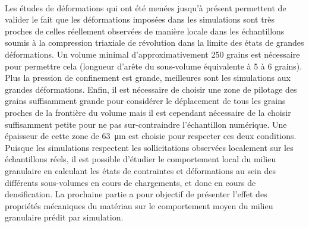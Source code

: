 	\paragraph{}
	Les études de déformations qui ont été menées jusqu'à présent permettent de valider le fait que les déformations imposées dans les simulations sont très proches de celles réellement observées de manière locale dans les échantillons soumis à la compression triaxiale de révolution dans la limite des états de grandes déformations. Un volume minimal d'approximativement \num{250} grains est nécessaire pour permettre cela (longueur d'arête du sous-volume équivalente à \num{5} à \num{6} grains). Plus la pression de confinement est grande, meilleures sont les simulations aux grandes déformations. Enfin, il est nécessaire de choisir une zone de pilotage des grains suffisamment grande pour considérer le déplacement de tous les grains proches de la frontière du volume mais il est cependant nécessaire de la choisir suffisamment petite pour ne pas sur-contraindre l'échantillon numérique. Une épaisseur de cette zone de \SI{63}{\micro\meter} est choisie pour respecter ces deux conditions.
	\\Puisque les simulations respectent les sollicitations observées localement sur les échantillons réels, il est possible d'étudier le comportement local du milieu granulaire en calculant les états de contraintes et déformations au sein des différents sous-volumes en cours de chargements, et donc en cours de densification. La prochaine partie a pour objectif de présenter l'effet des propriétés mécaniques du matériau sur le comportement moyen du milieu granulaire prédit par simulation.

